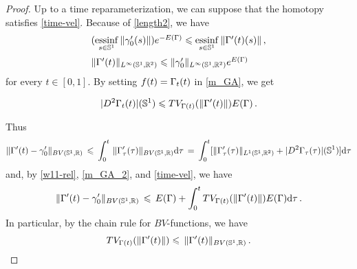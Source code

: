 \begin{proof}
 
Up to a time reparameterization, we can suppose that the homotopy satisfies \eqref{time-vel}. Because of \eqref{length2}, we have 
\begin{equation}\label{global_length}
\begin{array}{ll}
	(\underset{s\in \Circ}{\rm{essinf}}\,\|\gm_0'(s)\|)e^{-E(\GA)} 
	\leq \underset{s\in\Circ}{\rm{essinf}}\,\|\GA'(t)(s)\| \,,\vspace{0.2cm}\\
	 \|\GA'(t)\|_{L^\infty(\Circ,\RR^2)} \leq 
	\|\gm_0'\|_{\leb{\infty}} e^{ E(\GA)}
\end{array}
\end{equation}
for every $t\in [0,1]$. By setting  $f(t) =\Gamma_t(t)$ in \eqref{m_GA}, we get 

\begin{equation}\label{m_GA_2}
	|D^2 \Gamma_t(t)|(\mathbb{S}^1)\leqslant TV_{\Gamma(t)}(\|\Gamma'(t)\|)E(\Gamma)\,.
\end{equation}

Thus
$$
\|\Gamma'(t)-\gamma_0'\|_{BV(\mathbb{S}^1,\mathbb{R})}\, \leqslant  \,\int_0^t \,\|\Gamma'_{\tau}(\tau)\|_{BV(\mathbb{S}^1,\mathbb{R})} \mathrm{d} \tau \,=\, \int_0^t[\|\Gamma'_{\tau}(\tau)\|_{L^{1}(\mathbb{S}^1,\mathbb{R}^2)} + |D^2 \Gamma_{\tau}(\tau)|(\mathbb{S}^1) ] \mathrm{d} \tau $$
and, by \eqref{w11-rel}, 
\eqref{m_GA_2}, and \eqref{time-vel}, we have 
$$\|\Gamma'(t)-\gamma_0'\|_{BV(\mathbb{S}^1,\mathbb{R})} \,\leqslant \, E(\Gamma) +   \int_0^t TV_{\Gamma(t)}(\|\Gamma'(t)\|)E(\Gamma) \mathrm{d} \tau \,.
$$
In particular, by the chain rule for $BV$-functions, we have
$$ TV_{\Gamma(t)}(\|\Gamma'(t)\|)\leqslant\, \|\Gamma'(t)\|_{BV(\mathbb{S}^1,\mathbb{R})}\,.$$


\end{proof}
